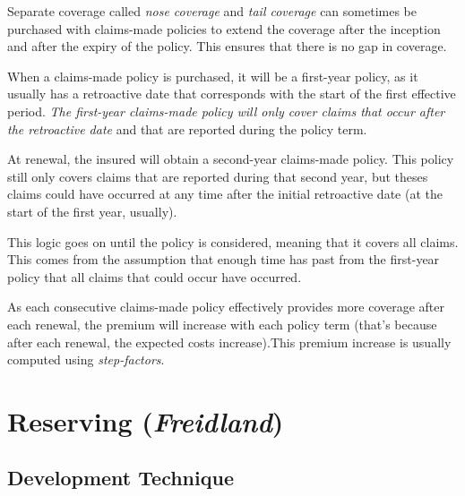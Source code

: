 \documentclass[11pt, english]{memoir}
\numberwithin{definition}{section}
\begin{document}
Separate coverage called \emph{nose coverage} and \emph{tail coverage} can sometimes be purchased with claims-made policies to extend the coverage after the inception and after the expiry of the policy. This ensures that there is no gap in coverage. 

When a claims-made policy is purchased, it will be a first-year policy, as it usually has a retroactive date that corresponds with the start of the first effective period. \emph{The first-year claims-made policy will only cover claims that occur after the retroactive date} and that are reported during the policy term. 

At renewal, the insured will obtain a second-year claims-made policy. This policy still only covers claims that are reported during that second year, but theses claims could have occurred at any time after the initial retroactive date (at the start of the first year, usually). 

This logic goes on until the policy is considered, meaning that it covers all claims. This comes from the assumption that enough time has past from the first-year policy that all claims that could occur have occurred. 


As each consecutive claims-made policy effectively provides more coverage after each renewal, the premium will increase with each policy term (that's because after each renewal, the expected costs increase).This premium increase is usually computed using \emph{step-factors}. 































\part{Reserving (\emph{Freidland})}
	
	




\chapter{Development Technique}
\end{document}
